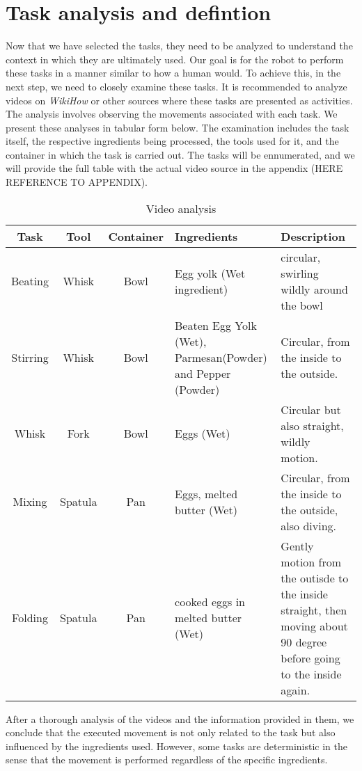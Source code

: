 \section{Task analysis and defintion}
Now that we have selected the tasks, they need to be analyzed to understand the context in which they are ultimately used. 
Our goal is for the robot to perform these tasks in a manner similar to how a human would. 
To achieve this, in the next step, we need to closely examine these tasks. 
It is recommended to analyze videos on \textit{WikiHow} \cite{wikihow} or other sources where these tasks are presented as activities. 
The analysis involves observing the movements associated with each task. 
We present these analyses in tabular form below. The examination includes the task itself, the respective ingredients being processed, the tools used for it, and the container in which the task is carried out.
The tasks will be ennumerated, and we will provide the full table with the actual video source in the appendix (HERE REFERENCE TO APPENDIX).
    \begin{table}[H]
    \centering
    \begin{tabular}{|c|c|c|p{}|p{}|}
        \hline
        \textbf{Task} & \textbf{Tool} & \textbf{Container} & \textbf{Ingredients} & \textbf{Description} \\
        \hline
        Beating & Whisk & Bowl & Egg yolk (Wet ingredient) & circular, swirling wildly around the bowl \\
        \hline
        Stirring & Whisk & Bowl & Beaten Egg Yolk (Wet), Parmesan(Powder) and Pepper (Powder) & Circular, from the inside to the outside. \\
        \hline
        Whisk & Fork & Bowl & Eggs (Wet) & Circular but also straight, wildly motion. \\
        \hline
        Mixing & Spatula & Pan & Eggs, melted butter (Wet) & Circular, from the inside to the outside, also diving. \\
        \hline
        Folding & Spatula & Pan & cooked eggs in melted butter (Wet) & Gently motion from the outisde to the inside straight, then moving about 90 degree before going to the inside again. \\
        \hline
      \end{tabular}
    \caption{Video analysis}
    \label{tab:videoanalysis}
  \end{table}


After a thorough analysis of the videos and the information provided in them, we conclude that the executed movement is not only related to the task but also influenced by the ingredients used. However, some tasks are deterministic in the sense that the movement is performed regardless of the specific ingredients.

